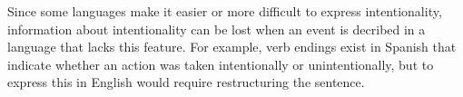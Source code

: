 \documentclass{article}
\begin{document}
\clearpage

\problem
Since some languages make it easier or more difficult to express intentionality, information about intentionality can be lost when an event is decribed in a language that lacks this feature. For example, verb endings exist in Spanish that indicate whether an action was taken intentionally or unintentionally, but to express this in English would require restructuring the sentence.
\end{document}
